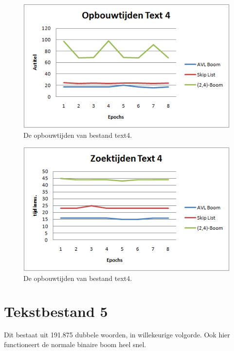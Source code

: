 \begin{figure}[h]
	\centering
		\includegraphics[width=\textwidth]{chap7/opbouwtijdtext4}
		\caption{De opbouwtijden van bestand text4.}
	\label{fig:opbouwtext4}
\end{figure}

\begin{figure}[h]
	\centering
		\includegraphics[width=\textwidth]{chap7/zoektijdtext4}
		\caption{De opbouwtijden van bestand text4.}
	\label{fig:zoektext4}
\end{figure}


\clearpage

\section{Tekstbestand 5}

Dit bestaat uit 191.875 dubbele woorden, in willekeurige volgorde. Ook hier functioneert de normale binaire boom heel snel.

